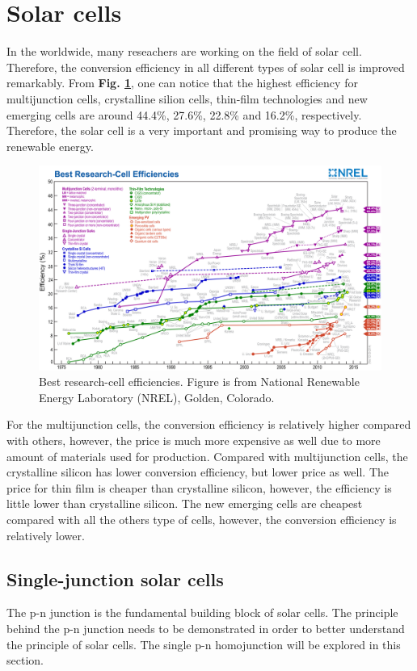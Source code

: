 \documentclass[a4paper, 12pt, titlepage,oneside,drop]{kthesis}
\begin{document}
\section{Solar cells}
In the worldwide, many reseachers are working on the field of solar cell. Therefore, the conversion efficiency in all different types of solar cell is improved remarkably. 
From \textbf{Fig. \ref{nrel}}, one can notice that the highest efficiency for multijunction cells, crystalline silion cells, thin-film technologies and new emerging cells are around 
44.4\%, 27.6\%, 22.8\% and 16.2\%, respectively. Therefore, the solar cell is a very important and promising way to produce the renewable energy.

\begin{figure}[H]
\centering
\includegraphics[scale=0.3]{efficiency_chart.jpg}
\caption{Best research-cell efficiencies. Figure is from National Renewable Energy Laboratory (NREL), Golden, Colorado.}
\label{nrel}
\end{figure}

For the multijunction cells, the conversion efficiency is relatively higher compared with others, however, the price is much more expensive as well due to more amount of materials used for production.
Compared with multijunction cells, the crystalline silicon has lower conversion efficiency, but lower price as well. The price for thin film is cheaper than crystalline silicon, however,
the efficiency is little lower than crystalline silicon. The new emerging cells are cheapest compared with all the others type of cells, however, the conversion efficiency is 
relatively lower.


\subsection{Single-junction solar cells}
The p-n junction is the fundamental building block of solar cells. The principle behind the p-n junction needs to be demonstrated in order to better understand the principle of solar cells. 
The single p-n homojunction will be explored in this section.
\end{document}
